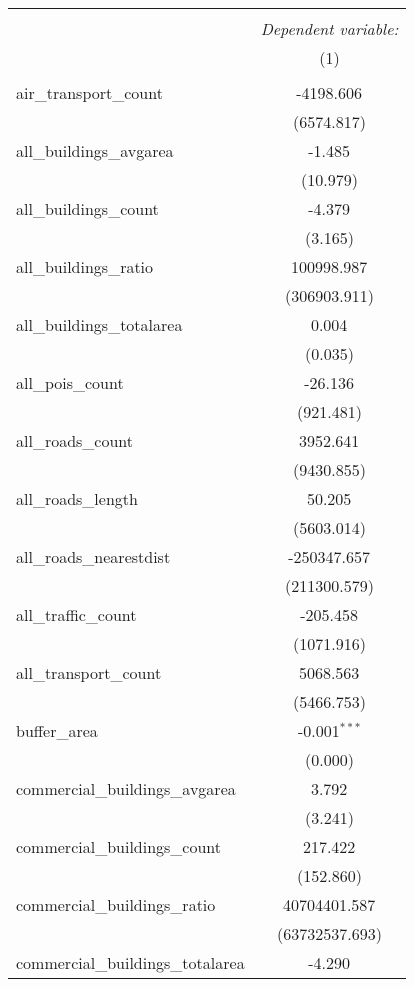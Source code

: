\begin{table}[!htbp] \centering
\begin{tabular}{@{\extracolsep{5pt}}lc}
\\[-1.8ex]\hline
\hline \\[-1.8ex]
& \multicolumn{1}{c}{\textit{Dependent variable:}} \
\cr \cline{1-2}
\\[-1.8ex] & (1) \\
\hline \\[-1.8ex]
 air_transport_count & -4198.606$^{}$ \\
  & (6574.817) \\
 all_buildings_avgarea & -1.485$^{}$ \\
  & (10.979) \\
 all_buildings_count & -4.379$^{}$ \\
  & (3.165) \\
 all_buildings_ratio & 100998.987$^{}$ \\
  & (306903.911) \\
 all_buildings_totalarea & 0.004$^{}$ \\
  & (0.035) \\
 all_pois_count & -26.136$^{}$ \\
  & (921.481) \\
 all_roads_count & 3952.641$^{}$ \\
  & (9430.855) \\
 all_roads_length & 50.205$^{}$ \\
  & (5603.014) \\
 all_roads_nearestdist & -250347.657$^{}$ \\
  & (211300.579) \\
 all_traffic_count & -205.458$^{}$ \\
  & (1071.916) \\
 all_transport_count & 5068.563$^{}$ \\
  & (5466.753) \\
 buffer_area & -0.001$^{***}$ \\
  & (0.000) \\
 commercial_buildings_avgarea & 3.792$^{}$ \\
  & (3.241) \\
 commercial_buildings_count & 217.422$^{}$ \\
  & (152.860) \\
 commercial_buildings_ratio & 40704401.587$^{}$ \\
  & (63732537.693) \\
 commercial_buildings_totalarea & -4.290$^{}$ \\

\end{tabular}
\end{table}
